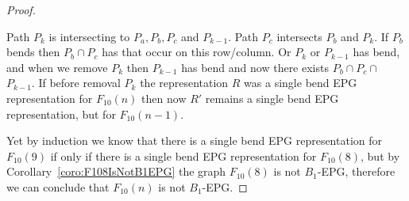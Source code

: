 \begin{proof}
\begin{itemize}
      Path $\displaystyle P_{{k}}$ is intersecting to $P_a, P_b, P_c$ and $\displaystyle P_{{k-1}}$. Path $P_c$ intersects $P_b$ and $\displaystyle P_{{k}}$. If $\displaystyle P_{b}$ bends then $P_b \cap P_c$ has that occur on this row/column. Or $\displaystyle P_{{k}}$ or $\displaystyle P_{{k-1}}$ has bend, and when we remove $\displaystyle P_{{k}}$ then $\displaystyle P_{{k-1}}$ has bend and now there exists $P_b \cap  P_c \cap $ $\displaystyle P_{{k-1}}$. If before removal $\displaystyle P_{{k}}$ the representation $R$ was a single bend EPG representation for $F_{10}(n)$ then now $R'$ remains a single bend EPG representation, but for $F_{10}(n-1)$.    
\end{itemize}

Yet by induction we know that there is a single bend EPG representation for $F_{10}(9)$ if only if there is a single bend EPG representation for $F_{10}(8)$, but by Corollary~\ref{coro:F108IsNotB1EPG} the graph $F_{10}(8)$ is not $B_1$-EPG, therefore we can conclude that $F_{10}(n)$ is not $B_1$-EPG.
 \end{proof} 














